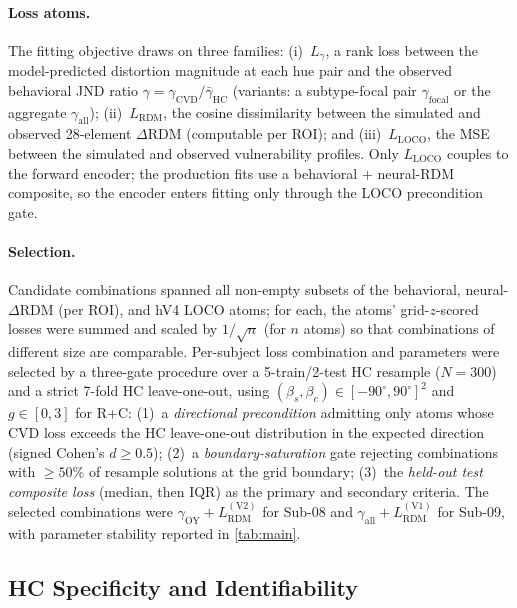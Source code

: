 \documentclass{article}
\begin{document}
\paragraph{Loss atoms.}
The fitting objective draws on three families: (i)~$L_\gamma$, a rank loss between the model-predicted distortion magnitude at each hue pair and the observed behavioral JND ratio $\gamma = \gamma_{\text{CVD}}/\bar\gamma_{\text{HC}}$ (variants: a subtype-focal pair $\gamma_{\text{focal}}$ or the aggregate $\gamma_{\text{all}}$); (ii)~$L_{\text{RDM}}$, the cosine dissimilarity between the simulated and observed 28-element $\Delta$RDM (computable per ROI); and (iii)~$L_{\text{LOCO}}$, the MSE between the simulated and observed vulnerability profiles. Only $L_{\text{LOCO}}$ couples to the forward encoder; the production fits use a behavioral $+$ neural-RDM composite, so the encoder enters fitting only through the LOCO precondition gate.

\paragraph{Selection.}
Candidate combinations spanned all non-empty subsets of the behavioral, neural-$\Delta$RDM (per ROI), and hV4 LOCO atoms; for each, the atoms' grid-$z$-scored losses were summed and scaled by $1/\sqrt{n}$ (for $n$ atoms) so that combinations of different size are comparable.
Per-subject loss combination and parameters were selected by a three-gate procedure over a 5-train/2-test HC resample ($N = 300$) and a strict 7-fold HC leave-one-out, using $(\beta_s, \beta_c) \in [-90^\circ, 90^\circ]^2$ and $g \in [0,3]$ for R+C: (1)~a \emph{directional precondition} admitting only atoms whose CVD loss exceeds the HC leave-one-out distribution in the expected direction (signed Cohen's $d \geq 0.5$); (2)~a \emph{boundary-saturation} gate rejecting combinations with $\geq 50\%$ of resample solutions at the grid boundary; (3)~the \emph{held-out test composite loss} (median, then IQR) as the primary and secondary criteria. The selected combinations were $\gamma_{\text{OY}} + L_{\text{RDM}}^{(\text{V2})}$ for Sub-08 and $\gamma_{\text{all}} + L_{\text{RDM}}^{(\text{V1})}$ for Sub-09, with parameter stability reported in \cref{tab:main}.

\subsection{HC Specificity and Identifiability}
\label{app:hc_specificity}
\end{document}
